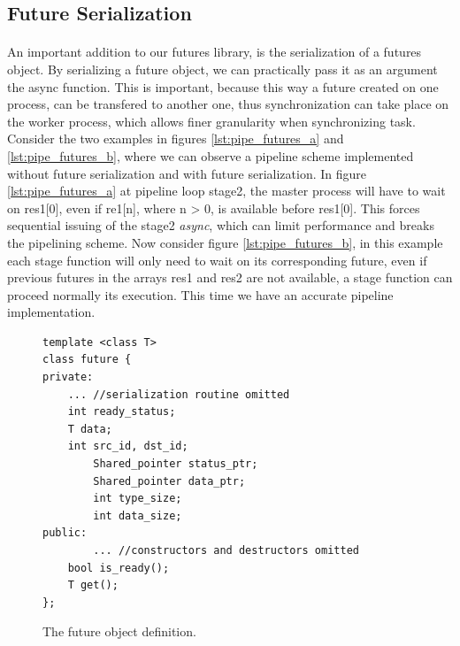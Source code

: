 \subsection{Future Serialization}
\paragraph{}
An important addition to our futures library, is the serialization of a futures object.  By serializing a future
object, we can practically pass it as an argument the async function.  This is important, because this way
a future created on one process, can be transfered to another one, thus synchronization can take place on the 
worker process, which allows finer granularity when synchronizing task.  Consider the two examples in figures 
\ref{lst:pipe_futures_a} and \ref{lst:pipe_futures_b}, where we can observe a pipeline scheme implemented 
without future serialization and with future serialization.  In figure \ref{lst:pipe_futures_a} at pipeline
loop stage2, the master process will have to wait on res1[0], even if re1[n], where n > 0, is available before
res1[0].  This forces sequential issuing of the stage2 \emph{async}, which can limit performance and breaks the 
pipelining scheme.  Now consider figure \ref{lst:pipe_futures_b}, in this example each stage function will only
need to wait on its corresponding future, even if previous futures in the arrays res1 and res2 are not available,
a stage function can proceed normally its execution.  This time we have an accurate pipeline implementation.

\begin{figure}[!ht]
\begin{lstlisting}
template <class T>
class future {
private:
	... //serialization routine omitted
    int ready_status;
    T data;
    int src_id, dst_id;
		Shared_pointer status_ptr;
		Shared_pointer data_ptr;
		int type_size;
		int data_size;
public:
		... //constructors and destructors omitted
    bool is_ready();
    T get();
};
\end{lstlisting}
\caption{The future object definition.}
\label{lst:future_object}
\end{figure}

